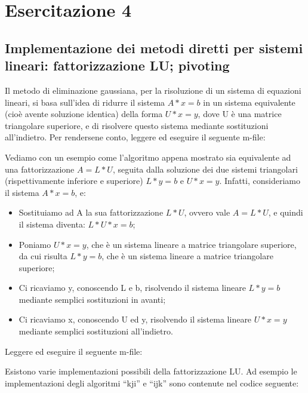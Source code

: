 \section{Esercitazione 4}

\subsection{Implementazione dei metodi diretti per sistemi lineari: fattorizzazione LU; pivoting}

Il metodo di eliminazione gaussiana, per la risoluzione di un sistema di equazioni lineari, si basa sull'idea di ridurre il sistema $A*x = b$ in un sistema equivalente (cioè avente soluzione identica) della forma $U*x = y$, dove U è una matrice triangolare superiore, e di risolvere questo sistema mediante sostituzioni all'indietro. Per rendersene conto, leggere ed eseguire il seguente m-file:



Vediamo con un esempio come l'algoritmo appena mostrato sia equivalente ad una fattorizzazione $A=L*U$, seguita dalla soluzione dei due sistemi triangolari (rispettivamente inferiore e superiore) $L*y=b$ e $U*x=y$. Infatti, consideriamo il sistema $A*x = b$, e:

\begin{itemize} 

\item Sostituiamo ad A la sua fattorizzazione $L*U$, ovvero vale $A = L*U$, e quindi il sistema diventa: $L*U*x = b$; 
\item Poniamo  $U*x = y$, che è un sistema lineare a matrice triangolare superiore, da cui risulta $L*y = b$, che è un sistema lineare a matrice triangolare superiore; 
\item Ci ricaviamo y, conoscendo L e b, risolvendo il sistema lineare $L*y = b$ mediante semplici sostituzioni in avanti; 
\item Ci ricaviamo x, conoscendo U ed y, risolvendo il sistema lineare $U*x = y$ mediante semplici sostituzioni all'indietro.

\end{itemize}

Leggere ed eseguire il seguente m-file:   



Esistono varie implementazioni possibili della fattorizzazione LU. Ad esempio le implementazioni degli algoritmi ``kji'' e ``ijk'' sono contenute nel codice seguente:

